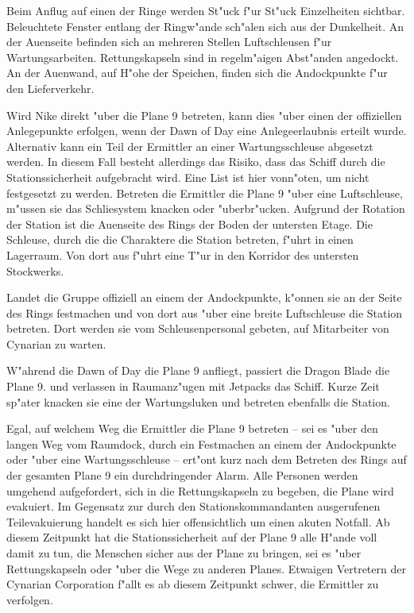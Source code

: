 Beim Anflug auf einen der Ringe werden St"uck f"ur St"uck Einzelheiten sichtbar. Beleuchtete Fenster entlang der Ringw"ande sch"alen sich aus der Dunkelheit. An der Au\3enseite befinden sich an mehreren Stellen Luftschleusen f"ur Wartungsarbeiten. Rettungskapseln sind in regelm"a\3igen Abst"anden angedockt. An der Au\3enwand, auf H"ohe der Speichen, finden sich die Andockpunkte f"ur den Lieferverkehr.

Wird Nike direkt "uber die Plane 9 betreten, kann dies "uber einen der offiziellen Anlegepunkte erfolgen, wenn der Dawn of Day eine Anlegeerlaubnis erteilt wurde. Alternativ kann ein Teil der Ermittler an einer Wartungsschleuse abgesetzt werden. In diesem Fall besteht allerdings das Risiko, dass das Schiff durch die Stationssicherheit aufgebracht wird. Eine List ist hier vonn"oten, um nicht festgesetzt zu werden. Betreten die Ermittler die Plane 9 "uber eine Luftschleuse, m"ussen sie das Schlie\3system knacken oder "uberbr"ucken. Aufgrund der Rotation der Station ist die Au\3enseite des Rings der Boden der untersten Etage. Die Schleuse, durch die die Charaktere die Station betreten, f"uhrt in einen Lagerraum. Von dort aus f"uhrt eine T"ur in den Korridor des untersten Stockwerks.

Landet die Gruppe offiziell an einem der Andockpunkte, k"onnen sie an der Seite des Rings festmachen und von dort aus "uber eine breite Luftschleuse die Station betreten. Dort werden sie vom Schleusenpersonal gebeten, auf Mitarbeiter von Cynarian zu warten.

W"ahrend die Dawn of Day die Plane 9 anfliegt, passiert die Dragon Blade die Plane 9. \xl{} und \ml{} verlassen in Raumanz"ugen mit Jetpacks das Schiff. Kurze Zeit sp"ater knacken sie eine der Wartungsluken und betreten ebenfalls die Station.

Egal, auf welchem Weg die Ermittler die Plane 9 betreten -- sei es "uber den langen Weg vom Raumdock, durch ein Festmachen an einem der Andockpunkte oder "uber eine Wartungsschleuse -- ert"ont kurz nach dem Betreten des Rings auf der gesamten Plane 9 ein durchdringender Alarm. Alle Personen werden umgehend aufgefordert, sich in die Rettungskapseln zu begeben, die Plane wird evakuiert. Im Gegensatz zur durch den Stationskommandanten ausgerufenen Teilevakuierung handelt es sich hier offensichtlich um einen akuten Notfall. Ab diesem Zeitpunkt hat die Stationssicherheit auf der Plane 9 alle H"ande voll damit zu tun, die Menschen sicher aus der Plane zu bringen, sei es "uber Rettungskapseln oder "uber die Wege zu anderen Planes. Etwaigen Vertretern der Cynarian Corporation f"allt es ab diesem Zeitpunkt schwer, die Ermittler zu verfolgen.

